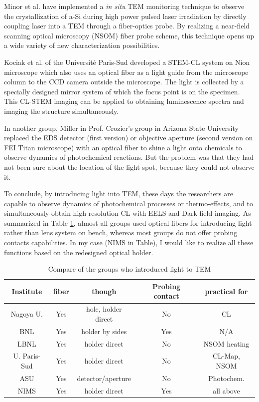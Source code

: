 Minor et al. have implemented a {\em in situ} TEM monitoring technique to observe the crystallization of a-Si during high power pulsed laser irradiation by directly coupling laser into a TEM through a fiber-optics probe. By realizing a near-field scanning optical microscopy (NSOM) fiber probe scheme, this technique opens up a wide variety of new characterization possibilities.\cite{Xiang2012}

Kociak et al. of the Université Paris-Sud \cite{Zagonel2011} developed a STEM-CL system on Nion microscope which also uses an optical fiber as a light guide from the microscope column to the CCD camera outside the microscope. The light is collected by a specially designed mirror system of which the focus point is on the specimen. This CL-STEM imaging can be applied to obtaining luminescence spectra and imaging the structure simultaneously.\cite{Nagarajan2016Simultaneous}

In another group, Miller in Prof. Crozier's group in Arizona State University replaced the EDS detector (first version) or objective aperture (second version on FEI Titan microscope) with an optical fiber to shine a light onto chemicals to observe dynamics of photochemical reactions.\cite{Miller2012} But the problem was that they had not been sure about the location of the light spot, because they could not observe it.

To conclude, by introducing light into TEM, these days the researchers are capable to observe dynamics of photochemical processes or thermo-effects, and to simultaneously obtain high resolution CL with EELS and Dark field imaging. As summarized in Table \ref{table2.2}, almost all groups used optical fibers for introducing light rather than lens system on bench, whereas most groups do not offer probing contacts capabilities. In my case (NIMS in Table), I would like to realize all these functions based on the redesigned optical holder. 

\begin{table}[ht]
\centering 
\begin{tabular}{|c|c|c|c|c|} 
\hline 
Institute & fiber & though & Probing contact & practical for\\ [0.5ex] 
\hline 
Nagoya U. & Yes & hole, holder direct & No & CL\\[1.5ex] 
BNL & Yes & holder by sides & Yes & N/A\\[1.5ex]
LBNL & Yes& holder direct & No & NSOM heating\\[1.5ex]
U. Paris-Sud & Yes & holder direct & No & CL-Map, NSOM\\[1.5ex]
ASU & Yes & detector/aperture & No & Photochem.\\[1.5ex]
NIMS & Yes & holder direct & Yes & all above\\
\hline
\end{tabular}
\caption{Compare of the groups who introduced light to TEM} 
\label{table2.2} 
\end{table}

